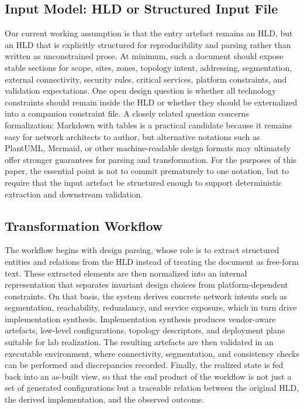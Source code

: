 \documentclass[conference]{IEEEtran}
\begin{document}
\subsection{Input Model: HLD or Structured Input File}

Our current working assumption is that the entry artefact remains an HLD, but an HLD that is explicitly structured for reproducibility and parsing rather than written as unconstrained prose. At minimum, such a document should expose stable sections for scope, sites, zones, topology intent, addressing, segmentation, external connectivity, security rules, critical services, platform constraints, and validation expectations. One open design question is whether all technology constraints should remain inside the HLD or whether they should be externalized into a companion constraint file. A closely related question concerns formalization: Markdown with tables is a practical candidate because it remains easy for network architects to author, but alternative notations such as PlantUML, Mermaid, or other machine-readable design formats may ultimately offer stronger guarantees for parsing and transformation. For the purposes of this paper, the essential point is not to commit prematurely to one notation, but to require that the input artefact be structured enough to support deterministic extraction and downstream validation.

\subsection{Transformation Workflow}

The workflow begins with design parsing, whose role is to extract structured entities and relations from the HLD instead of treating the document as free-form text. These extracted elements are then normalized into an internal representation that separates invariant design choices from platform-dependent constraints. On that basis, the system derives concrete network intents such as segmentation, reachability, redundancy, and service exposure, which in turn drive implementation synthesis. Implementation synthesis produces vendor-aware artefacts, low-level configurations, topology descriptors, and deployment plans suitable for lab realization. The resulting artefacts are then validated in an executable environment, where connectivity, segmentation, and consistency checks can be performed and discrepancies recorded. Finally, the realized state is fed back into an as-built view, so that the end product of the workflow is not just a set of generated configurations but a traceable relation between the original HLD, the derived implementation, and the observed outcome.
\end{document}
